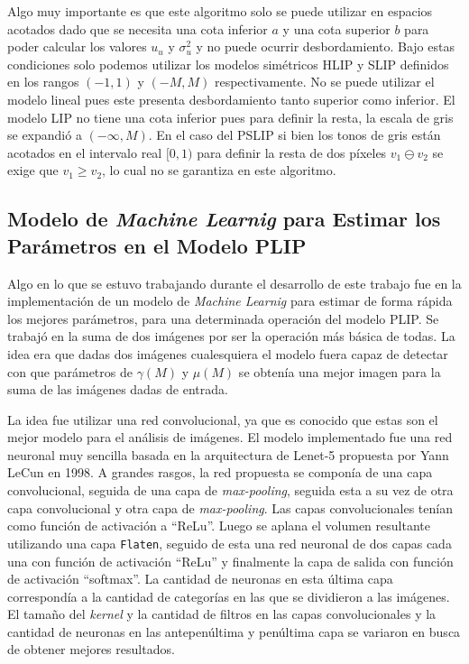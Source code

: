Algo muy importante es que este algoritmo solo se puede utilizar en espacios acotados dado que se necesita una cota inferior $a$ y una cota superior $b$ para poder calcular los valores $u_u$ y $\sigma_u^2$ y no puede ocurrir desbordamiento. Bajo estas condiciones solo podemos utilizar los modelos sim\'etricos HLIP y SLIP definidos en los rangos $(-1,1)$ y $(- M, M)$ respectivamente. No se puede utilizar el modelo lineal pues este presenta desbordamiento tanto superior como inferior. El modelo LIP no tiene una cota inferior pues para definir la resta, la escala de gris se expandi\'o a $(-\infty,M)$. En el caso del PSLIP si bien los tonos de gris est\'an acotados en el intervalo real $[0,1)$ para definir la resta de dos p\'ixeles $v_1\ominus v_2$ se exige que $v_1\geq v_2$, lo cual no se garantiza en este algoritmo.

\subsection{Modelo de \textit{Machine Learnig} para Estimar los Par\'ametros en el Modelo PLIP}

Algo en lo que se estuvo trabajando durante el desarrollo de este trabajo fue en la implementaci\'on de un modelo de \textit{Machine Learnig} para estimar de forma r\'apida los mejores par\'ametros, para una determinada operaci\'on del modelo PLIP. Se trabaj\'o en la suma de dos im\'agenes por ser la operaci\'on m\'as b\'asica de todas. La idea era que dadas dos im\'agenes cualesquiera el modelo fuera capaz de detectar con que par\'ametros de $\gamma(M)$ y $\mu(M)$ se obten\'ia una mejor imagen para la suma de las im\'agenes dadas de entrada.

La idea fue utilizar una red convolucional, ya que es conocido que estas son el mejor modelo para el an\'alisis de im\'agenes. El modelo implementado fue una red neuronal muy sencilla basada en la arquitectura de Lenet-5 propuesta por Yann LeCun en 1998. A grandes rasgos, la red propuesta se compon\'ia de una capa convolucional, seguida de una capa de \textit{max-pooling}, seguida esta a su vez de otra capa convolucional y otra capa de \textit{max-pooling}. Las capas convolucionales ten\'ian como funci\'on de activaci\'on a ``ReLu''. Luego se aplana el volumen resultante utilizando una capa \verb|Flaten|, seguido de esta una red neuronal de dos capas cada una con funci\'on de activaci\'on ``ReLu'' y finalmente la capa de salida con funci\'on de activaci\'on ``softmax''. La cantidad de neuronas en esta \'ultima capa correspond\'ia a la cantidad de categor\'ias en las que se dividieron a las im\'agenes. El tama\~no del \textit{kernel} y la cantidad de filtros en las capas convolucionales y la cantidad de neuronas en las antepen\'ultima y pen\'ultima capa se variaron en busca de obtener mejores resultados.


